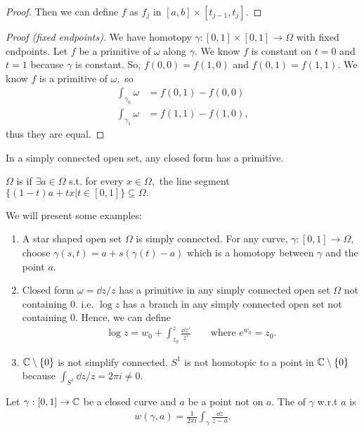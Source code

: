 \documentclass[a4paper,12pt]{article}
\begin{document}
\begin{theorem}
\begin{lemma}
\begin{proof}
            Then we can define $f$ as $f_j$ in $[a,b]\times[t_{j-1},t_j].$
        \end{proof}
    \end{lemma}
    \begin{proof}[Proof (fixed endpoints)]
        We have homotopy $\gamma:[0,1]\times[0,1]\to\Omega$ with fixed endpoints. Let $f$ be a primitive of $\omega$ along $\gamma.$ We know $f$ is constant on $t=0$ and $t=1$ because $\gamma$ is constant. So, $f(0,0)=f(1,0)$ and $f(0,1)=f(1,1).$ We know $f$ is a primitive of $\omega,$ so \begin{align}
            \int_{\gamma_0}\omega&=f(0,1)-f(0,0)\\
            \int_{\gamma_1}\omega&=f(1,1)-f(1,0),
        \end{align}
        thus they are equal.
    \end{proof}
    \begin{corollary}
        In a simply connected open set, any closed form has a primitive.
    \end{corollary}
\end{theorem}
\begin{definition}
    $\Omega$ is  if $\exists a\in\Omega$ s.t. for every $x\in\Omega,$ the line segment $\{(1-t)a+tx|t\in[0,1]\}\subseteq\Omega.$
\end{definition}
We will present some examples:
\begin{enumerate}
    \item A star shaped open set $\Omega$ is simply connected. For any curve, $\gamma:[0,1]\to\Omega,$ choose $\gamma(s,t)=a+s(\gamma(t)-a)$ which is a homotopy between $\gamma$ and the point $a.$
    \item Closed form $\omega=\dd z/z$ has a primitive in any simply connected open set $\Omega$ not containing $0.$ i.e. $\log z$ has a branch in any simply connected open set not containing $0.$ Hence, we can define \begin{align}
        \log z=w_0+\int_{z_0}^z\frac{\dd z'}{z'}\qquad\text{where }e^{w_0}=z_0.
    \end{align}
    
    \item $\mathbb{C}\setminus\{0\}$ is not simplify connected. $S^1$ is not homotopic to a point in $\mathbb{C}\setminus\{0\}$ because $\int_{S^1}\dd z/z=2\pi i\neq0.$
\end{enumerate}
\begin{definition}
    Let $\gamma:[0,1]\to\mathbb{C}$ be a closed curve and $a$ be a point not on $a.$ The  of $\gamma$ w.r.t $a$ is \begin{align}
        w(\gamma,a)=\frac{1}{2\pi i}\int_{\gamma}\frac{\dd z}{z-a}.
    \end{align}
\end{definition}
\end{document}
